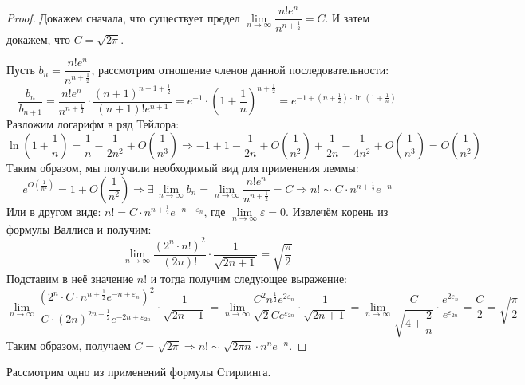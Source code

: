 \documentclass[12pt]{article}
\theoremstyle{definition}
\begin{document}
\begin{proof}
	Докажем сначала, что существует предел $\lim\limits_{n\to \infty} \dfrac{n!e^n}{n^{n+\tfrac{1}{2}}} = C$. И затем докажем, что $C = \sqrt{2 \pi}$.
	
	Пусть $b_n = \dfrac{n!e^n}{n^{n+\tfrac{1}{2}}}$, рассмотрим отношение членов данной последовательности:
	$$
		\dfrac{b_n}{b_{n+1}} = \dfrac{n!e^n}{n^{n+\tfrac{1}{2}}} {\cdot}\dfrac{(n+1)^{n+1 + \tfrac{1}{2}}}{(n+1)!e^{n+1}} = e^{-1}{\cdot}\left(1 + \dfrac{1}{n}\right)^{n + \tfrac{1}{2}} = e^{-1 + \left(n+\tfrac{1}{2}\right){\cdot}\ln\left(1 + \tfrac{1}{n}\right)}
	$$
	Разложим логарифм в ряд Тейлора:
	$$
		\ln\left(1+ \dfrac{1}{n}\right) = \dfrac{1}{n} - \dfrac{1}{2n^2} + O\left(\dfrac{1}{n^3}\right) \Rightarrow -1 + 1 - \dfrac{1}{2n} + O\left(\dfrac{1}{n^2}\right) + \dfrac{1}{2n} - \dfrac{1}{4n^2} + O\left(\dfrac{1}{n^3}\right) = O\left(\dfrac{1}{n^2}\right)
	$$
	Таким образом, мы получили необходимый вид для применения леммы:
	$$
		e^{O\left(\tfrac{1}{n^2}\right)} = 1 + O\left(\dfrac{1}{n^2}\right) \Rightarrow \exists \, \lim\limits_{n \to \infty} b_n =  \lim\limits_{n\to \infty} \dfrac{n!e^n}{n^{n+\tfrac{1}{2}}} = C \Rightarrow n! \sim C{\cdot}n^{n+\tfrac{1}{2}}e^{-n}
	$$
	Или в другом виде: $n! = C{\cdot}n^{n+\tfrac{1}{2}}e^{-n + \varepsilon_n}$, где $\lim\limits_{n \to \infty}\varepsilon = 0$.
	Извлечём корень из формулы Валлиса и получим:
	$$
		\lim\limits_{n \to \infty}\dfrac{(2^n{\cdot}n!)^2}{(2n)!}{\cdot}\dfrac{1}{\sqrt{2n + 1}} = \sqrt{\dfrac{\pi}{2}}
	$$
	Подставим в неё значение $n!$ и тогда получим следующее выражение:
	$$
		\lim\limits_{n \to \infty}\dfrac{(2^n{\cdot}C{\cdot}n^{n+\tfrac{1}{2}}e^{-n + \varepsilon_n})^2}{C{\cdot}(2n)^{2n+\tfrac{1}{2}}e^{-2n + \varepsilon_{2n}}}{\cdot}\dfrac{1}{\sqrt{2n + 1}} 
		= \lim\limits_{n \to \infty}\dfrac{C^2 n^{\tfrac{1}{2}}e^{2\varepsilon_n}}{\sqrt{2}Ce^{\varepsilon_{2n}}}{\cdot}\dfrac{1}{\sqrt{2n+1}} 
		= \lim\limits_{n\to \infty}\dfrac{C}{\sqrt{4 + \dfrac{2}{n}}}{\cdot}\dfrac{e^{2\varepsilon_n}}{e^{\varepsilon_{2n}}} = \dfrac{C}{2} = \sqrt{\dfrac{\pi}{2}}
	$$
	Таким образом, получаем $C = \sqrt{2\pi} \Rightarrow n! \sim \sqrt{2\pi n}{\cdot}n^{n}e^{-n}$.
\end{proof}

Рассмотрим одно из применений формулы Стирлинга.
\end{document}
